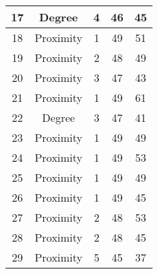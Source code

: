 \documentclass[results.tex]{subfiles}
\begin{document}
\begin{center}
\begin{tabular}{| c || c | c | c | c |}
            \hline
            17                      & Degree                       & 4                      & 46                      & 45                   \\
            \hline
            18                      & Proximity                    & 1                      & 49                      & 51                   \\
            \hline
            19                      & Proximity                    & 2                      & 48                      & 49                   \\
            \hline
            20                      & Proximity                    & 3                      & 47                      & 43                   \\
            \hline
            21                      & Proximity                    & 1                      & 49                      & 61                   \\
            \hline
            22                      & Degree                       & 3                      & 47                      & 41                   \\
            \hline
            23                      & Proximity                    & 1                      & 49                      & 49                   \\
            \hline
            24                      & Proximity                    & 1                      & 49                      & 53                   \\
            \hline
            25                      & Proximity                    & 1                      & 49                      & 49                   \\
            \hline
            26                      & Proximity                    & 1                      & 49                      & 45                   \\
            \hline
            27                      & Proximity                    & 2                      & 48                      & 53                   \\
            \hline
            28                      & Proximity                    & 2                      & 48                      & 45                   \\
            \hline
            29                      & Proximity                    & 5                      & 45                      & 37                   \\

\end{tabular}
\end{center}
\end{document}
